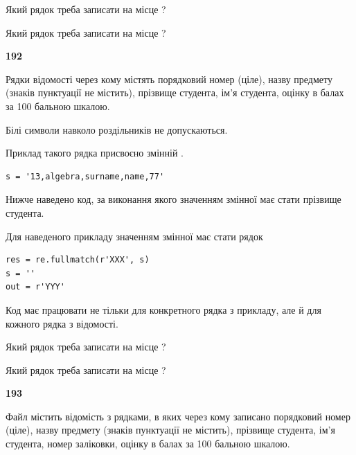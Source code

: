Який рядок треба записати на місце  ?\par
\vspace{5mm}


Який рядок треба записати на місце  ?\par


\newpage

{\begin {center}\textbf{ 192}\end {center}}\par
Рядки відомості через кому містять порядковий номер (ціле), назву предмету (зна\-ків пунктуації не містить), прізвище студента, ім'я студента, оцінку в балах за 100 бальною шкалою.

Білі символи навколо роздільників не допускаються.

Приклад такого рядка присвоєно змінній .



\begin{verbatim}
s = '13,algebra,surname,name,77'
\end{verbatim}


Нижче наведено код, за виконання якого значенням змінної  має стати прізвище студента.

Для наведеного прикладу значенням змінної  має стати рядок 



\begin{verbatim}
res = re.fullmatch(r'XXX', s)
s = ''
out = r'YYY'
\end{verbatim}


Код має працювати не тільки для конкретного рядка з прикладу, але й для кожного рядка з відомості.




Який рядок треба записати на місце  ?\par
\vspace{5mm}


Який рядок треба записати на місце  ?\par


\newpage

{\begin {center}\textbf{ 193}\end {center}}\par
Файл  містить відомість з рядками, в яких через кому записа\-но поряд\-ковий номер (ціле), назву предмету (знаків пунктуації не містить), прізвище студента, ім'я студента, номер заліковки, оцінку в балах за 100 бальною шкалою.

